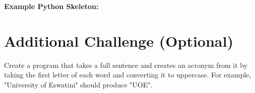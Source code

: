 \documentclass[a4paper,11pt]{article}
\theoremstyle{mytheor}
\begin{document}
\begin{enumerate}
    \textbf{Example Python Skeleton:}




    
    


    



\end{enumerate}

\section*{Additional Challenge (Optional)}

Create a program that takes a full sentence and creates an acronym from it by taking the first letter of each word and converting it to uppercase. For example, "University of Eswatini" should produce "UOE".
\end{document}
